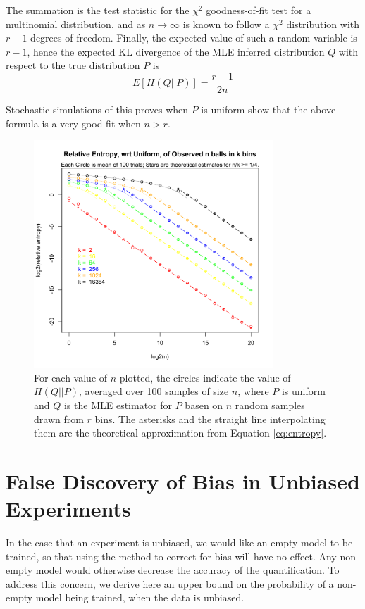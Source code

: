 \documentclass[letterpaper]{article}
\begin{document}
The summation is the test statistic for the $\chi^2$ goodness-of-fit test for a
multinomial distribution, and as $n \rightarrow \infty$ is known to follow a
$\chi^2$ distribution with $r - 1$ degrees of freedom. Finally, the expected
value of such a random variable is $r - 1$, hence the expected KL divergence of
the MLE inferred distribution $Q$ with respect to the true distribution $P$ is
\begin{equation}
\label{eq:entropy}
E[H(Q||P)] = \frac{r - 1}{2n}
\end{equation}

Stochastic simulations of this proves when $P$ is uniform show that the above
formula is a very good fit when $n > r$.

\begin{figure}[H]
\centerline{\includegraphics[width=0.8\textwidth]{fig/entropy.pdf}}
\caption{For each value of $n$ plotted, the circles indicate the value of
$H(Q||P)$, averaged over 100 samples of size $n$, where $P$ is uniform and $Q$
is the MLE estimator for $P$ basen on $n$ random samples drawn from $r$ bins.
The asterisks and the straight line interpolating them are the theoretical
approximation from Equation \ref{eq:entropy}.
}
\label{fig:entropy}
\end{figure}

\section{False Discovery of Bias in Unbiased Experiments}

In the case that an experiment is unbiased, we would like an empty model to be
trained, so that using the method to correct for bias will have no effect. Any
non-empty model would otherwise decrease the accuracy of the quantification. To
address this concern, we derive here an upper bound on the probability of a
non-empty model being trained, when the data is unbiased.
\end{document}
